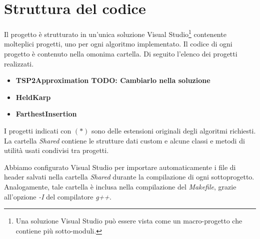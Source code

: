 \section{Struttura del codice}
\label{cap:code-structure}

Il progetto è strutturato in un'unica soluzione Visual Studio\footnote{Una soluzione Visual Studio può essere vista come un macro-progetto che contiene più sotto-moduli.} contenente molteplici progetti, uno per ogni algoritmo implementato. Il codice di ogni progetto è contenuto nella omonima cartella. Di seguito l'elenco dei progetti realizzati.

\begin{itemize}
    \item \textbf{TSP2Approximation TODO: Cambiarlo nella soluzione}
    \item \textbf{HeldKarp}
    \item \textbf{FarthestInsertion}
\end{itemize}

\noindent I progetti indicati con $(*)$ sono delle estensioni originali degli algoritmi richiesti.
\\

\noindent La cartella \textit{Shared} contiene le strutture dati custom e alcune classi e metodi di utilità usati
condivisi tra progetti.

\noindent Abbiamo configurato Visual Studio per importare automaticamente i file di header salvati nella cartella \textit{Shared}
durante la compilazione di ogni sottoprogetto. Analogamente, tale cartella è inclusa nella compilazione del \textit{Makefile}, grazie all'opzione \textit{-I} del compilatore \textit{g++}.

